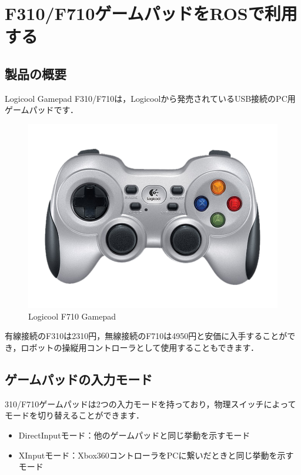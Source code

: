 \documentclass[{../../master}]{subfiles}
\begin{document}
\section{F310/F710ゲームパッドをROSで利用する}
\label{sec:f310_f710_gamepad}

\subsection{製品の概要}

  Logicool Gamepad F310/F710は，Logicoolから発売されているUSB接続のPC用ゲームパッドです．

  \begin{figure}[ht]
    \centering
    \includegraphics[width=65truemm, clip]{images/f710_overview.png}
    \caption{Logicool F710 Gamepad}
    \label{fig:f710_overview}
  \end{figure}

  有線接続のF310は2310円，無線接続のF710は4950円と安価に入手することができ，ロボットの操縦用コントローラとして使用することもできます．

\subsection{ゲームパッドの入力モード}

  310/F710ゲームパッドは2つの入力モードを持っており，物理スイッチによってモードを切り替えることができます．

  \begin{itemize}
    \item \textsf{DirectInput}モード：他のゲームパッドと同じ挙動を示すモード
    \item \textsf{XInput}モード：Xbox360コントローラをPCに繋いだときと同じ挙動を示すモード
  \end{itemize}
\end{document}

